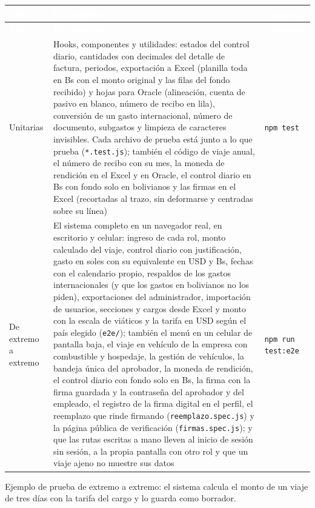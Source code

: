 \documentclass[11pt,letterpaper]{article}
\newcommand{\cabecera}{\rowcolor{maxamPrimario}}
\newcommand{\tth}[1]{\textcolor{white}{\textbf{#1}}}
\newcommand{\code}[1]{\nolinkurl{#1}}
\begin{document}
\begin{xltabular}{\textwidth}{L{2.8cm} Y L{3cm}}
\cabecera \tth{Tipo} & \tth{Qué prueba} & \tth{Comando} \\
\endfirsthead
\cabecera \tth{Tipo} & \tth{Qué prueba} & \tth{Comando} \\
\endhead
{} Unitarias & Hooks, componentes y utilidades: estados del control diario, cantidades con decimales del detalle de factura, periodos, exportación a Excel (planilla toda en Bs con el monto original y las filas del fondo recibido) y hojas para Oracle (alineación, cuenta de pasivo en blanco, número de recibo en lila), conversión de un gasto internacional, número de documento, subgastos y limpieza de caracteres invisibles. Cada archivo de prueba está junto a lo que prueba (\code{*.test.js}); también el código de viaje anual, el número de recibo con su mes, la moneda de rendición en el Excel y en Oracle, el control diario en Bs con fondo solo en bolivianos y las firmas en el Excel (recortadas al trazo, sin deformarse y centradas sobre su línea) & \code{npm test} \\
De extremo a extremo & El sistema completo en un navegador real, en escritorio y celular: ingreso de cada rol, monto calculado del viaje, control diario con justificación, gasto en soles con su equivalente en USD y Bs, fechas con el calendario propio, respaldos de los gastos internacionales (y que los gastos en bolivianos no los piden), exportaciones del administrador, importación de usuarios, secciones y cargos desde Excel y monto con la escala de viáticos y la tarifa en USD según el país elegido (\code{e2e/}); también el menú en un celular de pantalla baja, el viaje en vehículo de la empresa con combustible y hospedaje, la gestión de vehículos, la bandeja única del aprobador, la moneda de rendición, el control diario con fondo solo en Bs, la firma con la firma guardada y la contraseña del aprobador y del empleado, el registro de la firma digital en el perfil, el reemplazo que rinde firmando (\code{reemplazo.spec.js}) y la página pública de verificación (\code{firmas.spec.js}); y que las rutas escritas a mano lleven al inicio de sesión sin sesión, a la propia pantalla con otro rol y que un viaje ajeno no muestre sus datos & \code{npm run test:e2e} \\
\end{xltabular}

Ejemplo de prueba de extremo a extremo: el sistema calcula el monto de un viaje de tres días con la tarifa del cargo y lo guarda como borrador.
\end{document}
